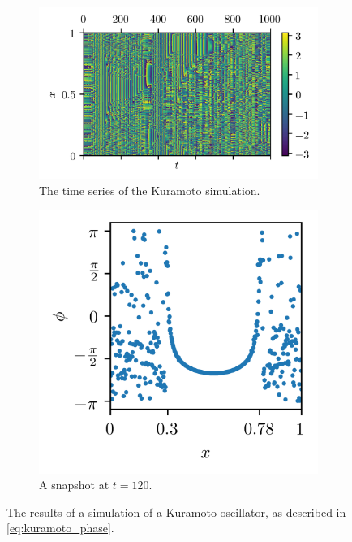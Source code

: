 \begin{figure}[ht]
  \centering
  \begin{subfigure}{0.6\textwidth}
    \centering
    \includegraphics[width=\textwidth]{figure/kuramoto_overhead}
    \caption{The time series of the Kuramoto simulation.}
    \label{fig:kuramoto_overhead}
  \end{subfigure} %
  \begin{subfigure}{0.35\textwidth}
    \centering
    \includegraphics[width=\textwidth]{figure/kuramoto_snapshot}
    \caption{A snapshot at $t = 120$.}
    \label{fig:kuramoto_snapshot}
  \end{subfigure}
  \caption[Kuramoto simulation]{The results of a simulation of a Kuramoto oscillator, as described in \cref{eq:kuramoto_phase}.
}
\end{figure}
